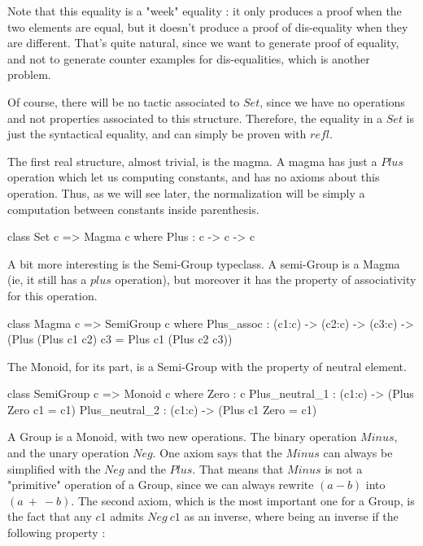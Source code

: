 \documentclass{sigplanconf}
\begin{document}
Note that this equality is a "week" equality : it only produces a proof when the two elements are equal, but it doesn't produce a proof of dis-equality when they are different. That's quite natural, since we want to generate proof of equality, and not to generate counter examples for dis-equalities, which is another problem.

Of course, there will be no tactic associated to $Set$, since we have no operations and not properties associated to this structure. Therefore, the equality in a $Set$ is just the syntactical equality, and can simply be proven with $refl$.

The first real structure, almost trivial, is the magma. A magma has just a $Plus$ operation which let us computing constants, and has no axioms about this operation. Thus, as we will see later, the normalization will be simply a computation between constants inside parenthesis.

\begin{code}[caption=Magma, captionpos=b, label=lst1:haskell2]   
class Set c => Magma c where
    Plus : c -> c -> c
\end{code}

A bit more interesting is the Semi-Group typeclass. A semi-Group is a Magma (ie, it still has a $plus$ operation), but moreover it has the property of associativity for this operation.

\begin{code}[caption=Semi-Group, captionpos=b, label=lst1:haskell2]   
class Magma c => SemiGroup c where
    Plus_assoc : (c1:c) -> (c2:c) -> (c3:c) 
           -> (Plus (Plus c1 c2) c3 
                = Plus c1 (Plus c2 c3))
\end{code}

The Monoid, for its part, is a Semi-Group with the property of neutral element.

\begin{code}[caption=Monoid, captionpos=b, label=lst1:haskell2]   
class SemiGroup c => Monoid c where
    Zero : c    
    Plus_neutral_1 : (c1:c) 
            -> (Plus Zero c1 = c1)    
    Plus_neutral_2 : (c1:c) 
             -> (Plus c1 Zero = c1)
\end{code}	

A Group is a Monoid, with two new operations. The binary operation $Minus$, and the unary operation $Neg$. One axiom says that the $Minus$ can always be simplified with the $Neg$ and the $Plus$. That means that $Minus$ is not a "primitive" operation of a Group, since we can always rewrite $(a-b)$ into $(a\ +\ -b)$.
The second axiom, which is the most important one for a Group, is the fact that any $c1$ admits $Neg\ c1$ as an inverse, where being an inverse if the following property :
\end{document}
